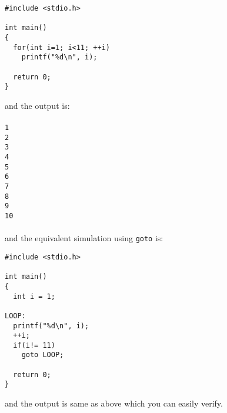 \begin{verbatim}
#include <stdio.h>

int main()
{
  for(int i=1; i<11; ++i)
    printf("%d\n", i);

  return 0;
}
\end{verbatim}
and the output is:
\\\\\texttt{1\\
2\\
3\\
4\\
5\\
6\\
7\\
8\\
9\\
10\\\\}
and the equivalent simulation using \texttt{goto} is:

\begin{verbatim}
#include <stdio.h>

int main()
{
  int i = 1;

LOOP:
  printf("%d\n", i);
  ++i;
  if(i!= 11)
    goto LOOP;

  return 0;
}
\end{verbatim}
and the output is same as above which you can easily verify.


